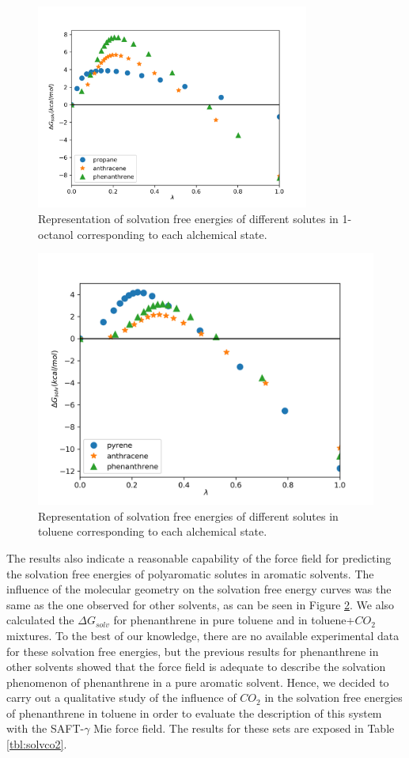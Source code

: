 \documentclass[
	12pt,				%
	openany,			%
	oneside,			%
	a4paper,			%
	english,			%
	brazil				%
	]{abntex2}
\begin{document}
\begin{figure}[H]
	\centering
	\includegraphics[width=0.8\textwidth]{Figures/oct}
	\caption{Representation of solvation free energies of different solutes in 1-octanol corresponding to each alchemical state.}
	\label{fig:oct}
\end{figure}

\begin{figure}[H]
	\centering
	\includegraphics[width=0.8\linewidth]{Figures/tol}
	\caption{Representation of solvation free energies of different solutes in toluene corresponding to each alchemical state. }
	\label{fig:tol}
\end{figure}

The results also indicate a reasonable capability of the force field for predicting the solvation free energies of polyaromatic solutes in aromatic solvents. The influence of the molecular geometry on the solvation free energy curves was the same as the one observed for other solvents, as can be seen in Figure \ref{fig:tol}.  We also calculated the $\Delta G_{solv}$ for phenanthrene in pure toluene and in toluene+$CO_{2}$ mixtures. To the best of our knowledge, there are no available experimental data for these solvation free energies, but the previous results for phenanthrene in other solvents showed that the force field is adequate to describe the solvation phenomenon of phenanthrene in a pure aromatic solvent. Hence, we decided to carry out a qualitative study of the influence of $CO_{2}$ in the solvation free energies of phenanthrene in toluene in order to evaluate the description of this system with the SAFT-$\gamma$ Mie force field. The results for these sets are exposed in Table \ref{tbl:solvco2}.  
\end{document}
